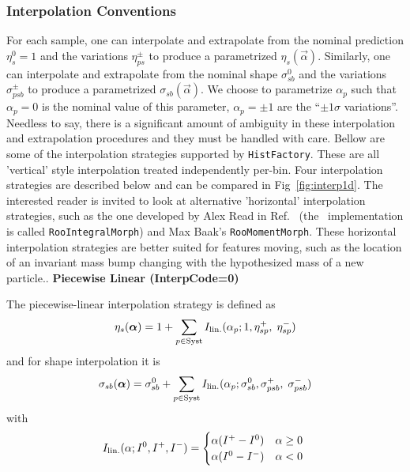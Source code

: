 \subsubsection{Interpolation Conventions}
\label{S:Interpolation} 

For each sample, one can interpolate and extrapolate from the nominal prediction $\eta_s^0=1$ and the variations $\eta^\pm_{ps}$ to produce a parametrized $\eta_s(\vec{\alpha})$.   Similarly, one can interpolate and extrapolate from the nominal shape $\sigma_{sb}^0$ and the variations $\sigma^\pm_{psb}$ to produce a parametrized $\sigma_{sb}(\vec{\alpha})$.  We choose to parametrize $\alpha_p$ such that $\alpha_p=0$ is the nominal value of this parameter, $\alpha_p=\pm 1$ are the ``$\pm 1\sigma$ variations''.  Needless to say, there is a significant amount of ambiguity in these interpolation and extrapolation procedures and they must be handled with care.  Bellow are some of the interpolation strategies supported by \texttt{HistFactory}.  These are all  'vertical' style interpolation treated independently per-bin. Four interpolation strategies are described below and can be compared in Fig~\ref{fig:interp1d}.  The interested reader is invited to look at alternative 'horizontal' interpolation strategies,  such as the one developed by Alex Read in Ref.~\cite{Read:1999kh} (the \roofit\ implementation is called \texttt{RooIntegralMorph}) and Max Baak's \texttt{RooMomentMorph}.  These horizontal interpolation strategies are better suited for features moving, such as the location of an invariant mass bump changing with the hypothesized mass of a new particle..
{\flushleft \bf Piecewise Linear (InterpCode=0)}


The piecewise-linear interpolation strategy is defined as
\begin{equation}
\eta_s ({\boldsymbol \alpha}) = 1+\sum_{p\in\textrm{Syst}} I_{\rm lin.}(\alpha_p; 1, \eta_{sp}^+, \; \eta_{sp}^- ) 
\end{equation}
and for shape interpolation it is
\begin{equation}
\sigma_{sb} ({\boldsymbol \alpha}) = \sigma_{sb}^0 + \sum_{p\in\textrm{Syst}} I_{\rm lin.}(\alpha_p;  \sigma_{sb}^0, \sigma_{psb}^+ ,\;
\sigma_{psb}^- )  
\end{equation}
with
\begin{equation}
 I_{\rm lin.}(\alpha;  I^0, I^+,I^- ) =
 \begin{cases}
     \alpha (I^+  -  I^0) &  \text{$\alpha\ge 0$} \\
     \alpha (I^0  -I^-)  &  \text{$\alpha<0$ }
 \end{cases}
\end{equation}


